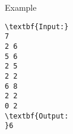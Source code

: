 Example
\begin{verbatim}
\textbf{Input:}
7
2 6
5 6
2 5
2 2
6 8
2 2
0 2 
\textbf{Output:
}6\end{verbatim}